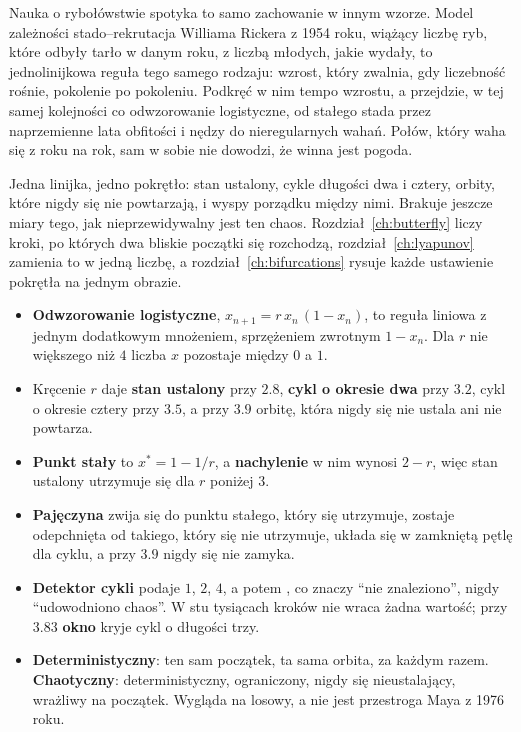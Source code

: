 \begin{worldbox}
Nauka o rybołówstwie spotyka to samo zachowanie w innym wzorze. Model
zależności stado--rekrutacja Williama Rickera z 1954 roku, wiążący liczbę
ryb, które odbyły tarło w danym roku, z liczbą młodych, jakie wydały, to
jednolinijkowa reguła tego samego rodzaju: wzrost, który zwalnia, gdy
liczebność rośnie, pokolenie po pokoleniu. Podkręć w nim tempo wzrostu, a
przejdzie, w tej samej kolejności co odwzorowanie logistyczne, od stałego
stada przez naprzemienne lata obfitości i nędzy do nieregularnych wahań.
Połów, który waha się z roku na rok, sam w sobie nie dowodzi, że winna jest
pogoda.
\end{worldbox}

\noindent
Jedna linijka, jedno pokrętło: stan ustalony, cykle długości dwa i cztery,
orbity, które nigdy się nie powtarzają, i wyspy porządku między nimi.
Brakuje jeszcze miary tego, jak nieprzewidywalny jest ten chaos.
Rozdział~\ref{ch:butterfly} liczy kroki, po których dwa bliskie początki
się rozchodzą, rozdział~\ref{ch:lyapunov} zamienia to w jedną liczbę, a
rozdział~\ref{ch:bifurcations} rysuje każde ustawienie pokrętła na jednym
obrazie.

\begin{summarybox}
\begin{itemize}
\item \textbf{Odwzorowanie logistyczne}, $x_{n+1} = r\,x_n\,(1 - x_n)$, to
  reguła liniowa z jednym dodatkowym mnożeniem, sprzężeniem zwrotnym
  $1 - x_n$. Dla $r$ nie większego niż $4$ liczba $x$ pozostaje między $0$
  a $1$.
\item Kręcenie $r$ daje \textbf{stan ustalony} przy $\num{2.8}$,
  \textbf{cykl o okresie dwa} przy $\num{3.2}$, cykl o okresie cztery przy
  $\num{3.5}$, a przy $\num{3.9}$ orbitę, która nigdy się nie ustala ani
  nie powtarza.
\item \textbf{Punkt stały} to $x^{*} = 1 - 1/r$, a \textbf{nachylenie} w
  nim wynosi $2 - r$, więc stan ustalony utrzymuje się dla $r$ poniżej $3$.
\item \textbf{Pajęczyna} zwija się do punktu stałego, który się utrzymuje,
  zostaje odepchnięta od takiego, który się nie utrzymuje, układa się w
  zamkniętą pętlę dla cyklu, a przy $\num{3.9}$ nigdy się nie zamyka.
\item \textbf{Detektor cykli} podaje $1$, $2$, $4$, a potem , co
  znaczy \enquote{nie znaleziono}, nigdy \enquote{udowodniono chaos}. W stu
  tysiącach kroków nie wraca żadna wartość; przy $\num{3.83}$ \textbf{okno}
  kryje cykl o długości trzy.
\item \textbf{Deterministyczny}: ten sam początek, ta sama orbita, za
  każdym razem. \textbf{Chaotyczny}: deterministyczny, ograniczony, nigdy
  się nieustalający, wrażliwy na początek. Wygląda na losowy, a nie jest
  \dash{} przestroga Maya z 1976 roku.
\end{itemize}
\end{summarybox}

